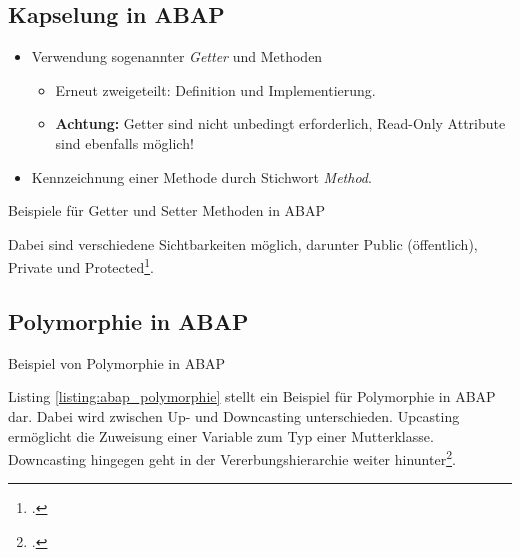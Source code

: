 \subsection{Kapselung in ABAP}
\begin{itemize}
  \item Verwendung sogenannter \textit{Getter} und  Methoden
  \begin{itemize}
    \item Erneut zweigeteilt: Definition und Implementierung.
    \item \textbf{Achtung:} Getter sind nicht unbedingt erforderlich, Read-Only Attribute sind ebenfalls möglich!
  \end{itemize}
  \item Kennzeichnung einer Methode durch Stichwort \textit{Method}.
\end{itemize}

\begin{listing}[ht]{}
  \caption{Beispiele für Getter und Setter Methoden in ABAP}
  \label{listing:abap_getter_setter}
\end{listing}
Dabei sind verschiedene Sichtbarkeiten möglich, darunter Public (öffentlich), Private und Protected\footcite[Vgl.][S. 83]{woodObjectorientedProgrammingABAP2016}.

\subsection{Polymorphie in ABAP}


\newenvironment{code}{\captionsetup{type=listing}}{}
\begin{code}
\caption{Beispiel von Polymorphie in ABAP\protect\footnotemark}
\label{listing:abap_polymorphie}
\end{code}
Listing \ref{listing:abap_polymorphie} stellt ein Beispiel für Polymorphie in ABAP dar. Dabei wird zwischen Up- und Downcasting unterschieden. Upcasting ermöglicht die Zuweisung einer Variable zum Typ einer Mutterklasse. Downcasting hingegen geht in der Vererbungshierarchie weiter hinunter\footcite[Vgl.][S. 73 ff.]{zaidiSAPABAPObjects2019}.

\newpage